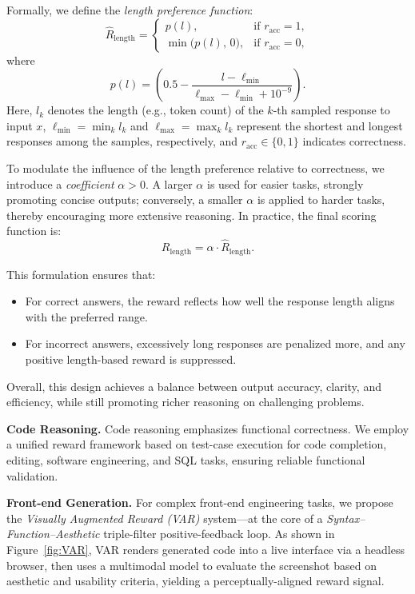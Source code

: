 \documentclass[table]{gtech}
\theoremstyle{definition}
\begin{document}
Formally, we define the \emph{length preference function}:
$$\hat{R}_{\text{length}} =\begin{cases}p(l), & \text{if } r_{\text{acc}} = 1, \\[4pt]\min\!\big(p(l),\, 0\big), & \text{if } r_{\text{acc}} = 0,\end{cases}$$
where
$$p(l) = \left(0.5 - \frac{l - \ell_{\min}}{\ell_{\max} - \ell_{\min} + 10^{-9}}\right).$$
Here, $l_k$ denotes the length (e.g., token count) of the $k$-th sampled response to input $x$, 
$\ell_{\min} = \min_k l_k$ and $\ell_{\max} = \max_k l_k$ represent the shortest and longest responses among the samples, respectively, and $r_{\text{acc}} \in \{0,1\}$ indicates correctness.  

To modulate the influence of the length preference relative to correctness, we introduce a \emph{coefficient} $\alpha > 0$.  
A larger $\alpha$ is used for easier tasks, strongly promoting concise outputs; conversely, a smaller $\alpha$ is applied to harder tasks, thereby encouraging more extensive reasoning.  
In practice, the final scoring function is:
$$R_{\text{length}} = \alpha \cdot \hat{R}_{\text{length}}.$$

This formulation ensures that:
\begin{itemize}
    \item For correct answers, the reward reflects how well the response length aligns with the preferred range.
    \item For incorrect answers, excessively long responses are penalized more, and any positive length-based reward is suppressed.
\end{itemize}
Overall, this design achieves a balance between output accuracy, clarity, and efficiency, while still promoting richer reasoning on challenging problems.

\textbf{Code Reasoning.}
Code reasoning emphasizes functional correctness. We employ a unified reward framework based on test-case execution for code completion, editing, software engineering, and SQL tasks, ensuring reliable functional validation.

\textbf{Front-end Generation.}
For complex front-end engineering tasks, we propose the \emph{Visually Augmented Reward (VAR)} system—at the core of a \emph{Syntax–Function–Aesthetic} triple-filter positive-feedback loop. As shown in Figure~\ref{fig:VAR}, VAR renders generated code into a live interface via a headless browser, then uses a multimodal model to evaluate the screenshot based on aesthetic and usability criteria, yielding a perceptually-aligned reward signal.
\end{document}
